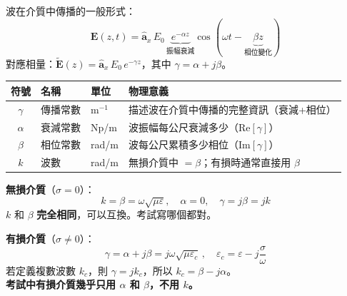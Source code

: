 \documentclass[12pt,a4paper]{article}
\newcommand{\vE}{\mathbf{E}}
\newcommand{\ax}{\hat{\mathbf{a}}_x}
\begin{document}
\begin{conceptbox}[這四個量是什麼？]
波在介質中傳播的一般形式：
\[
  \vE(z,t) = \ax\, E_0\, \underbrace{e^{-\alpha z}}_{\text{振幅衰減}} \cos(\omega t - \underbrace{\beta z}_{\text{相位變化}})
\]
對應相量：$\tilde{\vE}(z) = \ax\, E_0\, e^{-\gamma z}$，其中 $\gamma = \alpha + j\beta$。

\medskip
\begin{center}
\begin{tabular}{clll}
\toprule
\textbf{符號} & \textbf{名稱} & \textbf{單位} & \textbf{物理意義} \\
\midrule
$\gamma$ & 傳播常數 & m$^{-1}$ & 描述波在介質中傳播的完整資訊（衰減+相位） \\
$\alpha$ & 衰減常數 & Np/m & 波振幅每公尺衰減多少（$\text{Re}[\gamma]$） \\
$\beta$ & 相位常數 & rad/m & 波每公尺累積多少相位（$\text{Im}[\gamma]$） \\
$k$ & 波數 & rad/m & 無損介質中 $= \beta$；有損時通常直接用 $\beta$ \\
\bottomrule
\end{tabular}
\end{center}
\end{conceptbox}

\begin{formulabox}
\textbf{無損介質}（$\sigma = 0$）：
\[
  \boxed{k = \beta = \omega\sqrt{\mu\varepsilon}}, \quad \alpha = 0, \quad \gamma = j\beta = jk
\]
$k$ 和 $\beta$ \textbf{完全相同}，可以互換。考試寫哪個都對。

\medskip
\textbf{有損介質}（$\sigma \neq 0$）：
\[
  \gamma = \alpha + j\beta = j\omega\sqrt{\mu\varepsilon_c}\,, \quad \varepsilon_c = \varepsilon - j\frac{\sigma}{\omega}
\]
若定義複數波數 $k_c$，則 $\gamma = jk_c$，所以 $k_c = \beta - j\alpha$。\\
\textbf{考試中有損介質幾乎只用 $\alpha$ 和 $\beta$，不用 $k$。}
\end{formulabox}
\end{document}
